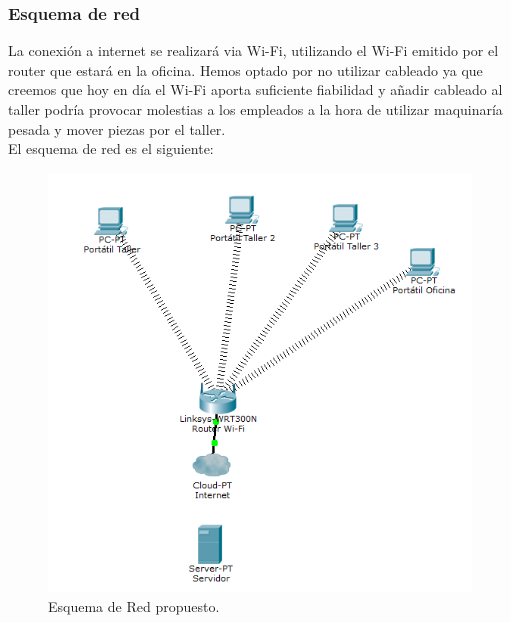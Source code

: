 \documentclass{article}
\begin{document}
\subsubsection{Esquema de red}
La conexión a internet se realizará via Wi-Fi, utilizando el Wi-Fi emitido por el router que estará en la oficina. Hemos optado 
por no utilizar cableado ya que creemos que hoy en día el Wi-Fi aporta suficiente fiabilidad y añadir cableado al taller podría provocar molestias a los empleados a la hora de utilizar 
maquinaría pesada y mover piezas por el taller.\\ 
El esquema de red es el siguiente: 
\begin{figure}[H]
  \centering
  \includegraphics[width=1.0\textwidth]{CapturasSistemas/EsquemaRed.png}
  \caption{Esquema de Red propuesto.}
  \label{fig:esquemared}
\end{figure}
\end{document}
